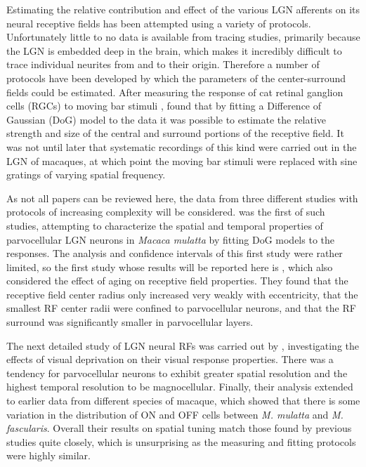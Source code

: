 Estimating the relative contribution and effect of the various LGN
afferents on its neural receptive fields has been attempted using a
variety of protocols. Unfortunately little to no data is available
from tracing studies, primarily because the LGN is embedded deep in
the brain, which makes it incredibly difficult to trace individual neurites
from and to their origin. Therefore a number of protocols have been
developed by which the parameters of the center-surround fields could
be estimated. After measuring the response of cat retinal ganglion cells
(RGCs) to moving bar stimuli \citep{Rodieck1965a,Rodieck1965b},
\cite{Rodieck1965} found that by fitting a Difference of Gaussian
(DoG) model to the data it was possible to estimate the relative
strength and size of the central and surround portions of the
receptive field. It was not until later that systematic recordings of
this kind were carried out in the LGN of macaques, at which point the
moving bar stimuli were replaced with sine gratings of varying spatial
frequency.

As not all papers can be reviewed here, the data from three different
studies with protocols of increasing complexity will be
considered. \cite{Derrington1984} was the first of such studies,
attempting to characterize the spatial and temporal properties of
parvocellular LGN neurons in \emph{Macaca mulatta} by fitting DoG
models to the responses. The analysis and confidence intervals of this
first study were rather limited, so the first study whose results will be
reported here is \cite{Spear1994}, which also considered the effect
of aging on receptive field properties. They found that the receptive
field center radius only increased very weakly with eccentricity, that the
smallest RF center radii were confined to parvocellular neurons, and
that the RF surround was significantly smaller in parvocellular
layers.

The next detailed study of LGN neural RFs was carried out by
\cite{Levitt2001}, investigating the effects of visual deprivation on
their visual response properties. There was a tendency for
parvocellular neurons to exhibit greater spatial resolution and the
highest temporal resolution to be magnocellular. Finally, their
analysis extended to earlier data from different species of macaque,
which showed that there is some variation in the distribution of ON
and OFF cells between \emph{M. mulatta} and
\emph{M. fascularis}. Overall their results on spatial tuning match
those found by previous studies quite closely, which is unsurprising
as the measuring and fitting protocols were highly similar.

